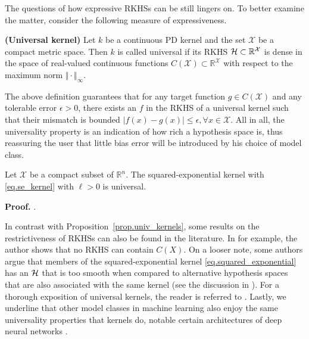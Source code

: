 The questions of how expressive RKHSs can be still lingers on. To better examine the matter, consider the following measure of expressiveness.

\begin{definition}
	\textbf{(Universal kernel)}
	\label{def.universal_kernel}
	Let $k$ be a continuous PD kernel and the set $\mathcal{X}$ be a compact metric space. Then $k$ is called universal if its RKHS $\mathcal{H} \subset \mathbb{R}^\mathcal{X}$ is dense in the space of real-valued continuous functions $C(\mathcal{X}) \subset \mathbb{R}^\mathcal{X}$ with respect to the maximum norm $\Vert \cdot \Vert_\infty$.
\end{definition}

The above definition guarantees that for any target function $g \in C(\mathcal{X})$ and any tolerable error $\epsilon > 0$, there exists an $f$ in the RKHS of a universal kernel such that their mismatch is bounded $| f(x) - g(x) | \leq \epsilon, \forall x \in \mathcal{X}$.
All in all, the universality property is an indication of how rich a hypothesis space is, thus reassuring the user that little bias error will be introduced by his choice of model class.

\begin{proposition}
	\label{prop.univ_kernels}
	Let $\mathcal{X}$ be a compact subset of $\mathbb{R}^n$. The squared-exponential kernel with \eqref{eq.se_kernel} with $\ell >0$ is universal.
\end{proposition}

\begin{my_proof}
	\textbf{Proof.}
	\cite[Corollary~4.58]{steinwart2008svm_book}.
\end{my_proof}

In contrast with Proposition~\ref{prop.univ_kernels}, some results on the restrictiveness of RKHSs can also be found in the literature. In \cite{steinwart2020_no_rkhs_cont_func} for example, the author shows that no RKHS can contain $C(X)$. On a looser note, some authors argue that members of the squared-exponential kernel \eqref{eq.squared_exponential} has an $\mathcal{H}$ that is too smooth when compared to alternative hypothesis spaces that are also associated with the same kernel (see the discussion in \cite[§4]{kanagawa2018gaussian}). For a thorough exposition of universal kernels, the reader is referred to \cite{micchelli2006universal}. Lastly, we underline that other model classes in machine learning also enjoy the same universality properties that kernels do, notable certain architectures of deep neural networks \citep{kidger2020universal}.

